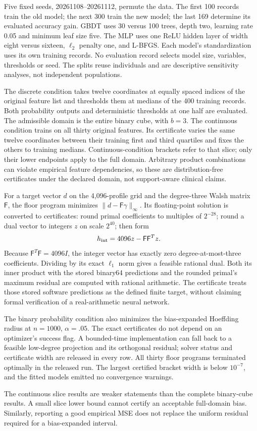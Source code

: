 Five fixed seeds, 20261108--20261112, permute the data. The first 100
records train the old model; the next 300 train the new model; the last
169 determine its evaluated accuracy gain. GBDT uses 30 versus 100 trees,
depth two, learning rate 0.05 and minimum leaf size five. The MLP uses
one ReLU hidden layer of width eight versus sixteen, $\ell_2$ penalty one,
and L-BFGS. Each model's standardization uses its own training records.
No evaluation record selects model size, variables, thresholds or seed. The splits reuse individuals and are descriptive sensitivity analyses, not independent populations.

The discrete condition takes twelve coordinates at equally spaced indices
of the original feature list and thresholds them at medians of the 400
training records. Both probability outputs and deterministic thresholds
at one half are evaluated. The admissible domain is the entire binary
cube, with $b=3$. The continuous condition trains on all thirty original
features. Its certificate varies the same twelve coordinates between
their training first and third quartiles and fixes the others to training
medians. Continuous-condition brackets refer to that slice; only their
lower endpoints apply to the full domain. Arbitrary product combinations
can violate empirical feature dependencies, so these are distribution-free
certificates under the declared domain, not support-aware clinical claims.

For a target vector $d$ on the 4,096-profile grid and the degree-three
Walsh matrix $\mathsf F$, the floor program minimizes
$\|d-\mathsf F\gamma\|_\infty$. Its floating-point solution is converted
to certificates: round primal coefficients to multiples of $2^{-28}$;
round a dual vector to integers $z$ on scale $2^{40}$; then form
\[
 h_{\rm int}=4096z-\mathsf F\mathsf F^Tz.
\]
Because $\mathsf F^T\mathsf F=4096I$, the integer vector has exactly zero
degree-at-most-three coefficients. Dividing by its exact $\ell_1$ norm
gives a feasible rational dual. Both its inner product with the stored
binary64 predictions and the rounded primal's maximum residual are
computed with rational arithmetic. The certificate treats those stored
software predictions as the defined finite target, without claiming
formal verification of a real-arithmetic neural network.

The binary probability condition also minimizes the bias-expanded
Hoeffding radius at $n=1000$, $\alpha=.05$. The exact certificates do not
depend on an optimizer's success flag. A bounded-time implementation can
fall back to a feasible low-degree projection and its orthogonal residual;
solver status and certificate width are released in every row.
All thirty floor programs terminated optimally in the released run. The
largest certified bracket width is below $10^{-7}$, and the fitted models
emitted no convergence warnings.



The continuous slice results are weaker statements than the complete
binary-cube results. A small slice lower bound cannot certify an acceptable
full-domain bias. Similarly, reporting a good empirical MSE does not
replace the uniform residual required for a bias-expanded interval.
